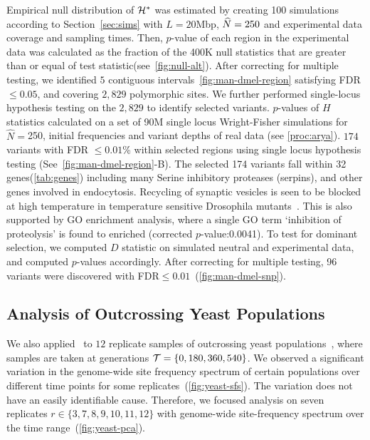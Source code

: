 Empirical null distribution of ${\cal H}^*$ was
estimated by creating 100 simulations according to
Section~\ref{sec:sims} with $L=20$Mbp, $\widehat{N}=250$ and experimental data
coverage and sampling times.  Then, $p$-value of each region in the
experimental data was calculated as the fraction of the 400K null
statistics that are greater than or equal of test
statistic(see~\ref{fig:null-alt}).  After correcting for multiple
testing, we identified $5$ contiguous
intervals~\ref{fig:man-dmel-region} satisfying FDR$\le0.05$, and
covering $2,829$ polymorphic sites. We further performed single-locus
hypothesis testing on the $2,829$ to identify selected variants.
$p$-values of $H$ statistics calculated on a set of 90M single locus
Wright-Fisher simulations for $\widehat{N}=$250, initial frequencies
and variant depths of real data (see \ref{proc:arya}).  $174$ variants
with FDR $\le0.01$\% within selected regions using single locus
hypothesis testing (See~\ref{fig:man-dmel-region}-B).  The selected 174 
variants fall within 32
genes(\ref{tab:genes}) including many Serine inhibitory proteases
(serpins), and other genes involved in endocytosis. Recycling of
synaptic vesicles is seen to be blocked at high temperature in
temperature sensitive Drosophila
mutants~\cite{kosaka1983reversible}. This is also supported by GO
enrichment analysis, where a single GO term `inhibition of
proteolysis' is found to enriched (corrected $p$-value:0.0041).  To
test for dominant selection, we computed $D$ statistic on simulated
neutral and experimental data, and computed $p$-values accordingly.
After correcting for multiple testing, 96 variants were discovered
with FDR$\le 0.01$~(\ref{fig:man-dmel-snp}).


\subsection{Analysis of Outcrossing Yeast Populations}
We also applied \comale\ to  $12$ replicate samples of
outcrossing yeast populations~\cite{burke2014standing}, where samples are 
taken at
generations ${\cal T}=\{0,180,360,540\}$. We observed a significant
variation in the genome-wide site frequency spectrum of certain
populations over different time points for some
replicates~(\ref{fig:yeast-sfs}). The variation does not have an
easily identifiable cause. Therefore, we focused analysis on seven
replicates $r\in\{3,7,8,9,10,11,12\}$ with genome-wide site-frequency
spectrum over the time range~(\ref{fig:yeast-pca}).

